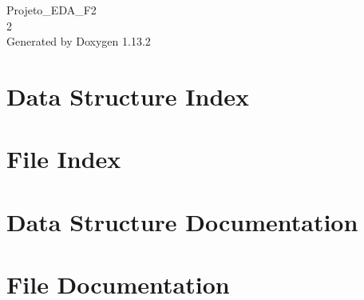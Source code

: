 \documentclass[twoside]{book}
\newcommand{\+}{\discretionary{\mbox{\scriptsize$\hookleftarrow$}}{}{}}
\newcommand{\clearemptydoublepage}{%
    \newpage{\pagestyle{empty}\cleardoublepage}%
  }
\begin{document}
  \raggedbottom
    \hypersetup{pageanchor=false,
                bookmarksnumbered=true,
                pdfencoding=unicode
               }
  \begin{titlepage}
  \vspace*{7cm}
  \begin{center}%
  {\Large Projeto\+\_\+\+EDA\+\_\+\+F2}\\
  [1ex]\large 2 \\
  \vspace*{1cm}
  {\large Generated by Doxygen 1.13.2}\\
  \end{center}
  \end{titlepage}
  \clearemptydoublepage
  \tableofcontents
  \clearemptydoublepage
  \hypersetup{pageanchor=true}
\chapter{Data Structure Index}

\chapter{File Index}

\chapter{Data Structure Documentation}



\chapter{File Documentation}










  \backmatter
  \newpage
  \clearemptydoublepage
  \printindex
\end{document}
